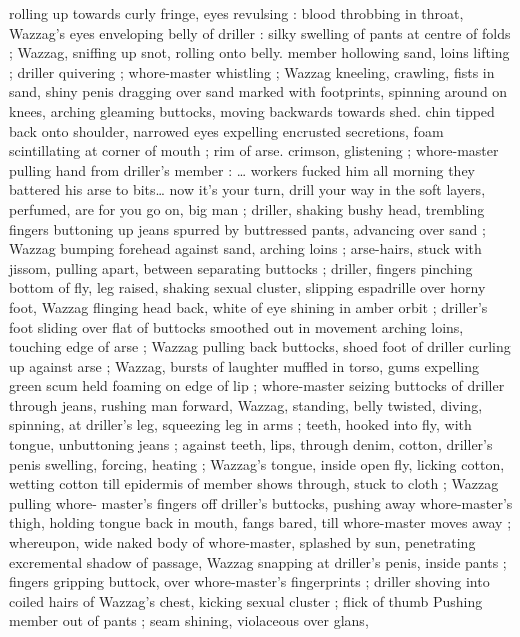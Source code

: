 rolling up towards curly fringe, eyes revulsing : blood throbbing in 
throat, Wazzag's eyes enveloping belly of driller : silky swelling of 
pants at centre of folds ; Wazzag, sniffing up snot, rolling onto belly. 
member hollowing sand, loins lifting ; driller quivering ; whore-master 
whistling ; Wazzag kneeling, crawling, fists in sand, shiny penis 
dragging over sand marked with footprints, spinning around on 
knees, arching gleaming buttocks, moving backwards towards shed. 
chin tipped back onto shoulder, narrowed eyes expelling encrusted 
secretions, foam scintillating at corner of mouth ; rim of arse. 
crimson, glistening ; whore-master pulling hand from driller's 
member : {\td} {\gl} {\ldots} workers fucked him all morning{\td} they battered his 
arse to bits{\ldots} now it's your turn, drill your way in{\td} the soft layers, 
perfumed, are for you{\td} go on, big man {\gr} ; driller, shaking bushy head, 
trembling fingers buttoning up jeans spurred by buttressed pants, 
advancing over sand ; Wazzag bumping forehead against sand, 
arching loins ; arse-hairs, stuck with jissom, pulling apart, between 
separating buttocks ; driller, fingers pinching bottom of fly, leg 
raised, shaking sexual cluster, slipping espadrille over horny foot, 
Wazzag flinging head back, white of eye shining in amber orbit ; 
driller's foot sliding over flat of buttocks smoothed out in movement 
arching loins, touching edge of arse ; Wazzag pulling back buttocks, 
shoed foot of driller curling up against arse ; Wazzag, bursts of 
laughter muffled in torso, gums expelling green scum held foaming 
on edge of lip ; whore-master seizing buttocks of driller through 
jeans, rushing man forward, Wazzag, standing, belly twisted, diving, 
spinning, at driller's leg, squeezing leg in arms ; teeth, hooked into 
fly, with tongue, unbuttoning jeans ; against teeth, lips, through 
denim, cotton, driller's penis swelling, forcing, heating ; Wazzag's 
tongue, inside open fly, licking cotton, wetting cotton till epidermis 
of member shows through, stuck to cloth ; Wazzag pulling whore- 
master's fingers off driller's buttocks, pushing away whore-master's 
thigh, holding tongue back in mouth, fangs bared, till whore-master 
moves away ; whereupon, wide naked body of whore-master, 
splashed by sun, penetrating excremental shadow of passage, 
Wazzag snapping at driller's penis, inside pants ; fingers gripping 
buttock, over whore-master's fingerprints ; driller shoving into coiled 
hairs of Wazzag's chest, kicking sexual cluster ; flick of thumb 
Pushing member out of pants ; seam shining, violaceous over glans, 
